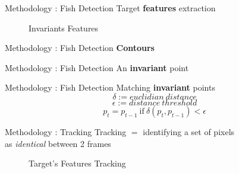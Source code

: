 \documentclass{beamer}
\begin{document}
\begin{frame}[c]{Methodology : Fish Detection}
\center Target \textbf{features} extraction\\
\begin{figure}[hbtp]
\centering
\caption{Invariants Features}
\end{figure}
\end{frame}

\begin{frame}[c]{Methodology : Fish Detection}
\center \textbf{Contours} \\
\begin{figure}[hbtp]
\centering
\end{figure}
\end{frame}

\begin{frame}[c]{Methodology : Fish Detection}
\center An \textbf{invariant} point \\
\begin{figure}[hbtp]
\centering
\end{figure}
\end{frame}


\begin{frame}[c]{Methodology : Fish Detection}
\center Matching \textbf{invariant} points \\

$$
\delta := euclidian\ distance
$$
$$
\epsilon := distance\ threshold
$$
$$
p_t = p_{t-1}\ \text{if}\ \delta(p_t, p_{t-1}) < \epsilon
$$

\end{frame}


\begin{frame}[c]{Methodology : Tracking}
\center Tracking $=$ identifying a set of pixels \\as \textit{identical} between 2 frames\\
\begin{figure}[hbtp]
\centering
\caption{Target's Features Tracking}
\end{figure}
\end{frame}
\end{document}

